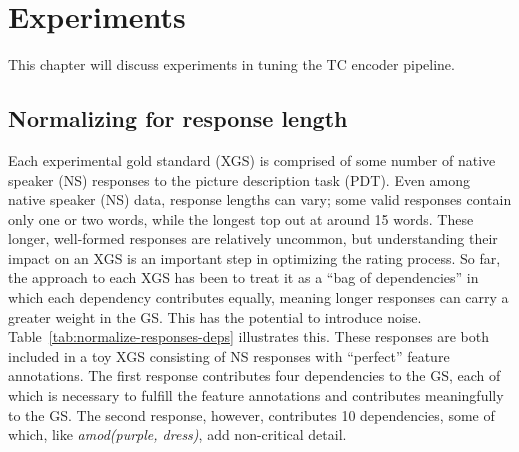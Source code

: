 \chapter{Experiments}
\label{chap:experiments}
This chapter will discuss experiments in tuning the TC encoder pipeline.

\section{Normalizing for response length}
\label{section:experiment-normalizing-length}

Each experimental gold standard (XGS) is comprised of some number of native speaker (NS) responses to the picture description task (PDT). Even among native speaker (NS) data, response lengths can vary; some valid responses contain only one or two words, while the longest top out at around 15 words. These longer, well-formed responses are relatively uncommon, but understanding their impact on an XGS is an important step in optimizing the rating process. So far, the approach to each XGS has been to treat it as a ``bag of dependencies'' in which each dependency contributes equally, meaning longer responses can carry a greater weight in the GS. This has the potential to introduce noise. Table~\ref{tab:normalize-responses-deps} illustrates this. These responses are both included in a toy XGS consisting of NS responses with ``perfect'' feature annotations. The first response contributes four dependencies to the GS, each of which is necessary to fulfill the feature annotations and contributes meaningfully to the GS. The second response, however, contributes 10 dependencies, some of which, like \textit{amod(purple, dress)}, add non-critical detail.


